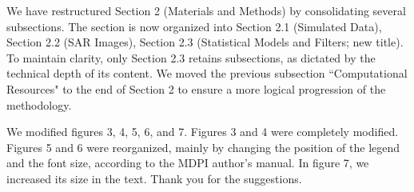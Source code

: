 \documentclass[a4paper,10pt]{article}
\begin{document}
\begin{tcolorbox}[colback=white,colframe=black,title=Changes 4]
We have restructured Section 2 (Materials and Methods) by consolidating several subsections. The section is now organized into Section 2.1 (Simulated Data), Section 2.2 (SAR Images), Section 2.3 (Statistical Models and Filters; new title). 
To maintain clarity, only Section 2.3 retains subsections, as dictated by the technical depth of its content. 
We moved the previous subsection ``Computational Resources" to the end of Section 2 to ensure a more logical progression of the methodology.

We modified figures 3, 4, 5, 6, and 7. 
Figures 3 and 4 were completely modified. 
Figures 5 and 6 were reorganized, mainly by changing the position of the legend and the font size, according to the MDPI author's manual. 
In figure 7, we increased its size in the text. 
Thank you for the suggestions.
\end{tcolorbox}


%
%
\end{document}
